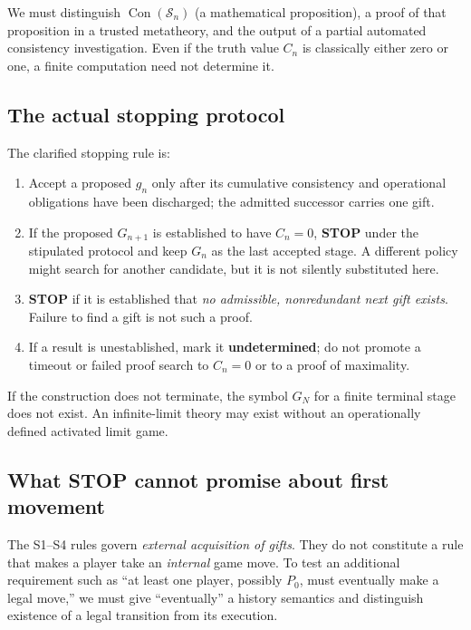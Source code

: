 \documentclass[11pt,letterpaper]{article}
\theoremstyle{definition}\newtheorem{definition}[theorem]{Definition}\newtheorem{example}[theorem]{Example}
\theoremstyle{remark}\newtheorem{remark}[theorem]{Remark}
\newcommand{\Con}{\operatorname{Con}}
\newcommand{\Stage}{\mathcal{S}}
\begin{document}
We must distinguish $\Con(\Stage_n)$ (a mathematical proposition), a proof of that proposition in a trusted metatheory, and the output of a partial automated consistency investigation. Even if the truth value $C_n$ is classically either zero or one, a finite computation need not determine it.

\subsection{The actual stopping protocol}
The clarified stopping rule is:
\begin{enumerate}[label=\textbf{S\arabic*.}]
\item Accept a proposed $g_n$ only after its cumulative consistency and operational obligations have been discharged; the admitted successor carries one gift.
\item If the proposed $G_{n+1}$ is established to have $C_n=0$, \textbf{STOP} under the stipulated protocol and keep $G_n$ as the last accepted stage. A different policy might search for another candidate, but it is not silently substituted here.
\item \textbf{STOP} if it is established that \emph{no admissible, nonredundant next gift exists}. Failure to find a gift is not such a proof.
\item If a result is unestablished, mark it \textbf{undetermined}; do not promote a timeout or failed proof search to $C_n=0$ or to a proof of maximality.
\end{enumerate}
If the construction does not terminate, the symbol $G_N$ for a finite terminal stage does not exist. An infinite-limit theory may exist without an operationally defined activated limit game.

\subsection{What STOP cannot promise about first movement}\label{sec:stop-liveness}
The S1--S4 rules govern \emph{external acquisition of gifts}. They do not
constitute a rule that makes a player take an \emph{internal} game move. To test
an additional requirement such as ``at least one player, possibly $P_0$, must
eventually make a legal move,'' we must give ``eventually'' a history semantics
and distinguish existence of a legal transition from its execution.
\end{document}
